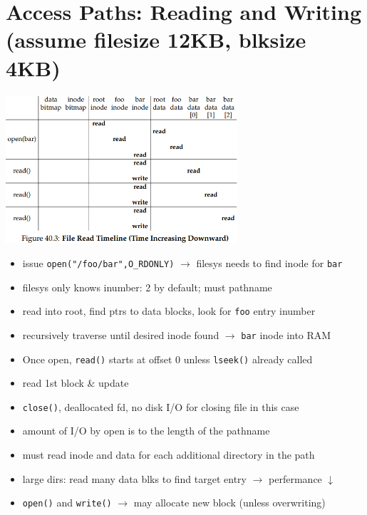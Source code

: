 \section*{Access Paths: Reading and Writing (assume filesize 12KB, blksize 4KB)}
\includegraphics[width=\linewidth, height=5.5cm]{imgs/fs_read_timeline}
\begin{itemize}
\item issue \texttt{open("/foo/bar",O\_RDONLY)} $\to$ filesys needs to find inode for \texttt{bar}
\item filesys only knows  inumber: 2 by default; must  pathname
\item read into root, find ptrs to data blocks, look for \texttt{foo} entry inumber
\item recursively traverse until desired inode found $\to$ \texttt{bar} inode into RAM
\item Once open, \texttt{read()} starts at offset 0 unless \texttt{lseek()} already called
\item read 1st block \& update
\item \texttt{close()}, deallocated fd, no disk I/O for closing file in this case
\item amount of I/O by open is  to the length of the pathname
\item must read inode and data for each additional directory in the path
\item large dirs: read many data blks to find target entry $\to$ perfermance $\downarrow$
\item \texttt{open()} and \texttt{write()} $\to$ may allocate new block (unless overwriting)

\end{itemize}
